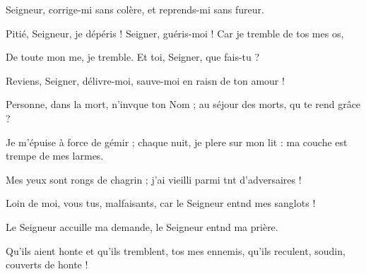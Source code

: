 \item Seigneur, corrige-mi sans colère,\psstar{} et reprends-mi sans fureur.
\item Pitié, Seigneur, je dépéris ! Seigner, guéris-moi !\psstar{} Car je tremble de tos mes os,
\item De toute mon me, je tremble.\psstar{} Et toi, Seigner, que fais-tu ?
\item Reviens, Seigner, délivre-moi,\psstar{} sauve-moi en raisn de ton amour !
\item Personne, dans la mort, n’invque ton Nom ;\psstar{} au séjour des morts, qu te rend grâce ?
\item Je m’épuise à force de gémir ;\pscross{} chaque nuit, je plere sur mon lit :\psstar{} ma couche est trempe de mes larmes.
\item Mes yeux sont rongs de chagrin ;\psstar{} j’ai vieilli parmi tnt d’adversaires !
\item Loin de moi, vous tus, malfaisants,\psstar{} car le Seigneur entnd mes sanglots !
\item Le Seigneur accuille ma demande,\psstar{} le Seigneur entnd ma prière.
\item Qu’ils aient honte et qu’ils tremblent, tos mes ennemis,\psstar{} qu’ils reculent, soudin, couverts de honte !